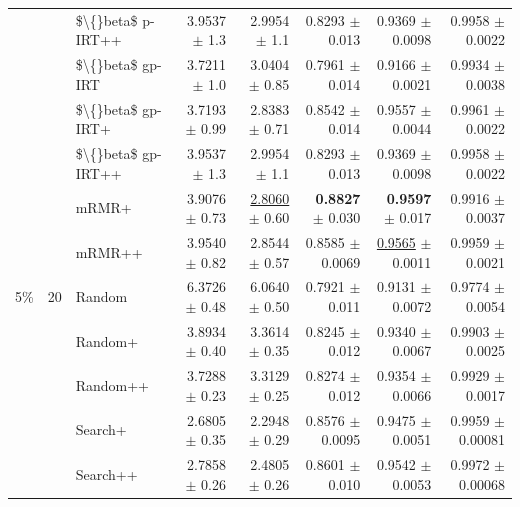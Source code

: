 \begin{longtable}{llp{}rrrrr}
 &  & \$\textbackslash\{\}beta\$ p-IRT++ & 3.9537 {\scriptsize $\pm$ 1.3} & 2.9954 {\scriptsize $\pm$ 1.1} & 0.8293 {\scriptsize $\pm$ 0.013} & 0.9369 {\scriptsize $\pm$ 0.0098} & 0.9958 {\scriptsize $\pm$ 0.0022} \\
 &  & \$\textbackslash\{\}beta\$ gp-IRT & 3.7211 {\scriptsize $\pm$ 1.0} & 3.0404 {\scriptsize $\pm$ 0.85} & 0.7961 {\scriptsize $\pm$ 0.014} & 0.9166 {\scriptsize $\pm$ 0.0021} & 0.9934 {\scriptsize $\pm$ 0.0038} \\
 &  & \$\textbackslash\{\}beta\$ gp-IRT+ & 3.7193 {\scriptsize $\pm$ 0.99} & 2.8383 {\scriptsize $\pm$ 0.71} & 0.8542 {\scriptsize $\pm$ 0.014} & 0.9557 {\scriptsize $\pm$ 0.0044} & 0.9961 {\scriptsize $\pm$ 0.0022} \\
 &  & \$\textbackslash\{\}beta\$ gp-IRT++ & 3.9537 {\scriptsize $\pm$ 1.3} & 2.9954 {\scriptsize $\pm$ 1.1} & 0.8293 {\scriptsize $\pm$ 0.013} & 0.9369 {\scriptsize $\pm$ 0.0098} & 0.9958 {\scriptsize $\pm$ 0.0022} \\
 &  & mRMR+ & 3.9076 {\scriptsize $\pm$ 0.73} & \underline{2.8060} {\scriptsize $\pm$ 0.60} & \textbf{0.8827} {\scriptsize $\pm$ 0.030} & \textbf{0.9597} {\scriptsize $\pm$ 0.017} & 0.9916 {\scriptsize $\pm$ 0.0037} \\
 &  & mRMR++ & 3.9540 {\scriptsize $\pm$ 0.82} & 2.8544 {\scriptsize $\pm$ 0.57} & 0.8585 {\scriptsize $\pm$ 0.0069} & \underline{0.9565} {\scriptsize $\pm$ 0.0011} & 0.9959 {\scriptsize $\pm$ 0.0021} \\
\midrule
5\% & 20 & Random & 6.3726 {\scriptsize $\pm$ 0.48} & 6.0640 {\scriptsize $\pm$ 0.50} & 0.7921 {\scriptsize $\pm$ 0.011} & 0.9131 {\scriptsize $\pm$ 0.0072} & 0.9774 {\scriptsize $\pm$ 0.0054} \\
 &  & Random+ & 3.8934 {\scriptsize $\pm$ 0.40} & 3.3614 {\scriptsize $\pm$ 0.35} & 0.8245 {\scriptsize $\pm$ 0.012} & 0.9340 {\scriptsize $\pm$ 0.0067} & 0.9903 {\scriptsize $\pm$ 0.0025} \\
 &  & Random++ & 3.7288 {\scriptsize $\pm$ 0.23} & 3.3129 {\scriptsize $\pm$ 0.25} & 0.8274 {\scriptsize $\pm$ 0.012} & 0.9354 {\scriptsize $\pm$ 0.0066} & 0.9929 {\scriptsize $\pm$ 0.0017} \\
 &  & Search+ & 2.6805 {\scriptsize $\pm$ 0.35} & 2.2948 {\scriptsize $\pm$ 0.29} & 0.8576 {\scriptsize $\pm$ 0.0095} & 0.9475 {\scriptsize $\pm$ 0.0051} & 0.9959 {\scriptsize $\pm$ 0.00081} \\
 &  & Search++ & 2.7858 {\scriptsize $\pm$ 0.26} & 2.4805 {\scriptsize $\pm$ 0.26} & 0.8601 {\scriptsize $\pm$ 0.010} & 0.9542 {\scriptsize $\pm$ 0.0053} & 0.9972 {\scriptsize $\pm$ 0.00068} \\

\end{longtable}
